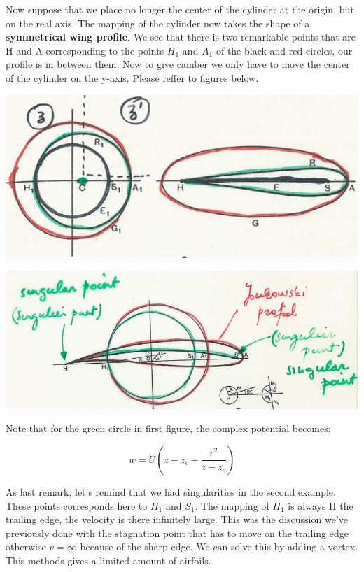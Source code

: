 		Now suppose that we place no longer the center of the cylinder at the origin, but on the real axis. The mapping of the cylinder now takes the shape of a \textbf{symmetrical wing profile}. We see that there is two remarkable points that are H and A corresponding to the points $H_1$ and $A_1$ of the black and red circles, our profile is in between them. Now to give camber we only have to move the center of the cylinder on the y-axis. Please reffer to figures below. 
		
		\begin{center}
		\begin{minipage}{0.45\textwidth}
		\includegraphics[scale=0.4]{ch2/31}
		\end{minipage}
		\begin{minipage}{0.45\textwidth}
		\includegraphics[scale=0.3]{ch2/32}
		\end{minipage}
		\end{center}
		
		Note that for the green circle in first figure, the complex potential becomes:
		
		\begin{equation}
		w = U\left( z-z_c + \frac{r^2}{z-z_c} \right)
		\end{equation}
		
		As last remark, let's remind that we had singularities in the second example. These points corresponds here to $H_1$ and $S_1$. The mapping of $H_1$ is always H the trailing edge, the velocity is there infinitely large. This was the discussion we've previously done with the stagnation point that has to move on the trailing edge otherwise $v = \infty$ because of the sharp edge. We can solve this by adding a vortex. This methods gives a limited amount of airfoils. 
		
